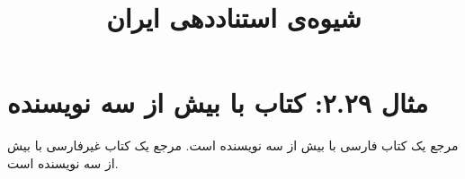 \documentclass[a4paper,10pt]{article}
\begin{document}
\title{شیوه‌ی استناددهی ایران
 }
\author{}
\date{}
\maketitle



\section*{مثال ۲.۲۹: کتاب با بیش از سه نویسنده}

مرجع \cite{اکبری1372} یک کتاب فارسی با بیش از سه نویسنده است. مرجع \cite{sechzer1996a} یک کتاب غیرفارسی با بیش از سه نویسنده است.






\end{document}
